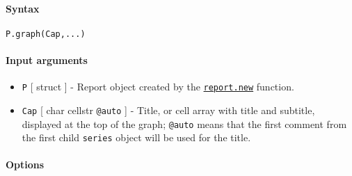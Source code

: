 


	\paragraph{Syntax}\label{syntax}

\begin{verbatim}
P.graph(Cap,...)
\end{verbatim}

\paragraph{Input arguments}\label{input-arguments}

\begin{itemize}
\item
  \texttt{P} {[} struct {]} - Report object created by the
  \href{report/new}{\texttt{report.new}} function.
\item
  \texttt{Cap} {[} char \textbar{} cellstr \textbar{} \texttt{@auto} {]}
  - Title, or cell array with title and subtitle, displayed at the top
  of the graph; \texttt{@auto} means that the first comment from the
  first child \texttt{series} object will be used for the title.
\end{itemize}

\paragraph{Options}\label{options}

